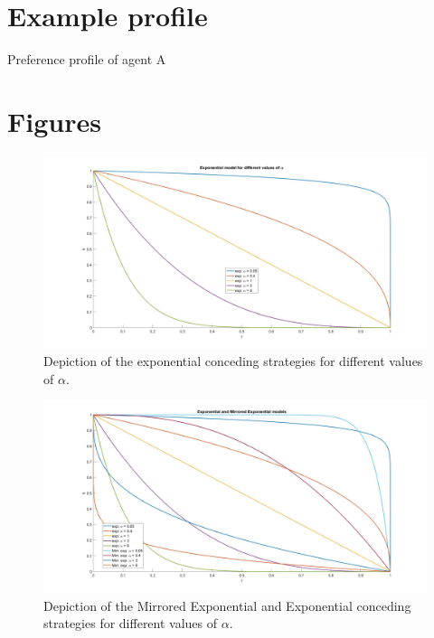\newpage

\section{Example profile}
\label{app:exampleprofile}

\caption{Preference profile of agent A}

\section*{Figures}
             \begin{figure}[H]
                \centering
                \includegraphics[width=17cm]{figures/Exponential.jpg}
                \caption{Depiction of the exponential conceding strategies for different values of $\alpha$.}
                \label{fig:exp}
            \end{figure}
            
            
            
           \begin{figure}[H]
                \centering
                \includegraphics[width=17cm]{figures/combined.jpg}
                \caption{Depiction of the Mirrored Exponential and Exponential conceding strategies for different values of $\alpha$.}
                \label{fig:both}
            \end{figure}
            

